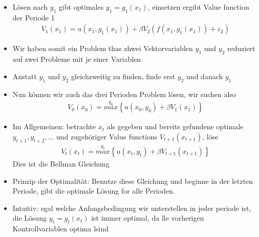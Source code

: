 \documentclass[smaller,compress]{beamer}  %
\begin{document}
\begin{frame}\small
  \begin{itemize}
    \item Lösen nach $y_1$ gibt optimales $y_1=g_1(x_1)$, einsetzen ergibt Value function der Periode 1
    \begin{align}
      V_1(x_1) = u(x_1,g_1(x_1))+\beta V_2\left(f(x_1,g_1(x_1))+\varepsilon_2\right) \label{eq:B2}
    \end{align}
    \item Wir haben somit ein Problem thas zhwei Vektorvariablen $y_1$ und $y_2$ reduziert auf zwei Probleme mit je einer Variablen
    \item Anstatt $y_1$ und $y_2$ gleichzweitig zu finden, finde erst $y_2$ und danach $y_1$
    \item Nun können wir auch das drei Perioden Problem lösen, wir suchen also
    \begin{align}
      V_0(x_0) = \overset{y_0}{max}\left\{u(x_0,y_0)+\beta V_1(x_1)\right\}
    \end{align}
    \item Im Allgemeinen: betrachte $x_t$ als gegeben und bereits gefundene optimale $y_{t+1}, y_{t+2},\dots$ und zugehöriger Value functions $V_{t+1}(x_{t+1})$, löse
    \begin{align}
      V_t(x_t) = \overset{y_t}{max}\left\{u(x_t,y_t)+\beta V_{t+1}(x_{t+1})\right\}
    \end{align}
    Dies ist die Bellman Gleichung
    \item Prinzip der Optimalität: Benutze diese Gleichung und beginne in der letzten Periode, gibt die optimale Lösung for alle Perioden.
    \item Intuitiv: egal welche Anfangsbedingung wir unterstellen in jeder periode ist, die Lösung $y_t=g_t(x_t)$ ist immer optimal, da lle vorherigen Kontrollvariablen optima lsind
  \end{itemize}
\end{frame}
\end{document}

